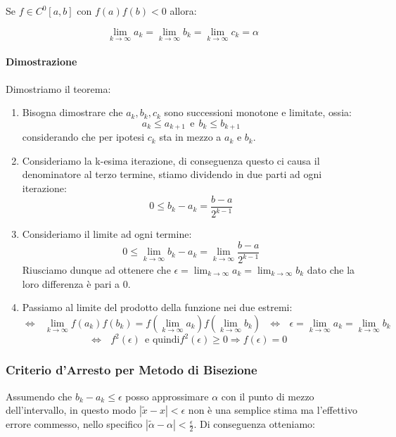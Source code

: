 \documentclass{article}
\begin{document}
Se $f \in C^{0}[a,b]$ con $f(a)f(b) < 0$ allora:

\[ \lim_{k \rightarrow \infty} a_{k} = \lim_{k \rightarrow \infty} b_{k} = \lim_{k \rightarrow \infty} c_{k} = \alpha \]

\paragraph{Dimostrazione} Dimostriamo il teorema:

\begin{enumerate}
    \item Bisogna dimostrare che $a_{k}, b_{k}, c_{k}$ sono successioni monotone e limitate, ossia:
    \[ a_{k} \leq a_{k+1} \:\: \text{e} \:\: b_{k} \leq b_{k+1} \]
    considerando che per ipotesi $c_{k}$ sta in mezzo a $a_{k}$ e $b_{k}$.
    \item Consideriamo la k-esima iterazione, di conseguenza questo ci causa il denominatore al terzo termine, stiamo dividendo in due parti ad ogni iterazione:
    \[ 0 \leq b_{k} - a_{k} = \frac{b - a}{2^{k-1}} \]
    \item Consideriamo il limite ad ogni termine:
    \[ 0 \leq \lim_{k \rightarrow \infty} b_{k} - a_{k} = \lim_{k \rightarrow \infty} \frac{b - a}{2^{k-1}} \]
    Riusciamo dunque ad ottenere che $\epsilon = \lim_{k \rightarrow \infty} a_{k} = \lim_{k \rightarrow \infty} b_{k}$ dato che la loro differenza è pari a $0$.
    \item Passiamo al limite del prodotto della funzione nei due estremi:
    \[ \Leftrightarrow \:\:\: \lim_{k \rightarrow \infty} f(a_{k})f(b_{k}) = f(\lim_{k \rightarrow \infty}a_{k})f(\lim_{k \rightarrow \infty}b_{k}) \:\:\: \Leftrightarrow \:\:\: \epsilon = \lim_{k \rightarrow \infty} a_{k} = \lim_{k \rightarrow \infty} b_{k} \]
    \[ \Leftrightarrow \:\:\: f^{2}(\epsilon) \:\: \text{e quindi} f^{2}(\epsilon) \geq 0 \Rightarrow \boxed{f(\epsilon) = 0} \:\:\: \boxed{} \]
\end{enumerate}

\subsubsection{Criterio d'Arresto per Metodo di Bisezione}

Assumendo che $b_{k} - a_{k} \leq \epsilon$ posso approssimare $\alpha$ con il punto di mezzo dell'intervallo, in questo modo $| \tilde{x} - x | < \epsilon$ non è una semplice stima ma l'effettivo errore commesso, nello specifico $| \tilde{\alpha} - \alpha | < \frac{\epsilon}{2}$.
Di conseguenza otteniamo:
\end{document}
